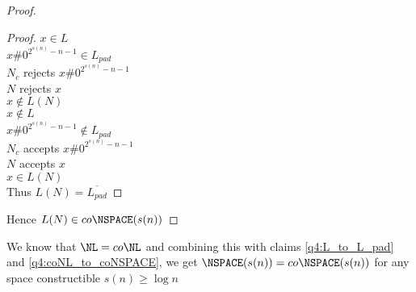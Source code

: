 \begin{proof}
\begin{proof}
        $x \in L$\\
        \imp
        $x\#0^{2^{s(n)} - n - 1} \in L_{pad}$\\
        \imp
        $N_c$ rejects $x\#0^{2^{s(n)} - n - 1}$\\
        \imp
        $N$ rejects $x$\\
        \imp
        $x \notin L(N)$\\

        $x \notin L$\\
        \imp
        $x\#0^{2^{s(n)} - n - 1} \notin L_{pad}$\\
        \imp
        $N_c$ accepts $x\#0^{2^{s(n)} - n - 1}$\\
        \imp
        $N$ accepts $x$\\
        \imp
        $x \in L(N)$\\
        Thus $L(N) = \overline{L_{pad}}$  
    \end{proof}
    Hence $L(N) \in co\NSPACE(s(n))$
\end{proof}

We know that $\NL = co\NL$ and combining this with claims \ref{q4:L_to_L_pad} and \ref{q4:coNL_to_coNSPACE}, we get $\NSPACE(s(n)) = co\NSPACE(s(n))$ for any space constructible $s(n) \ge \log n$







